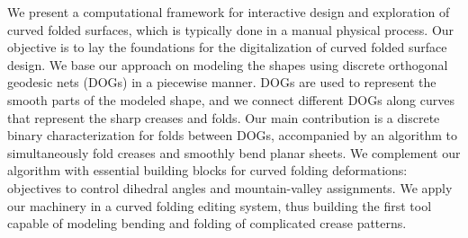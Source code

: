 We present a computational framework for interactive design and exploration of curved folded surfaces, which is typically done in a manual physical process. Our objective is to lay the foundations for the digitalization of curved folded surface design.
We base our approach on modeling the shapes using discrete orthogonal geodesic nets (DOGs) in a piecewise manner. DOGs are used to represent the smooth parts of the modeled shape, and we connect different DOGs along curves that represent the sharp creases and folds. 
Our main 
contribution is a discrete binary characterization for folds between DOGs, accompanied by an algorithm to simultaneously fold creases and smoothly bend planar sheets. We complement our algorithm with essential building blocks for curved folding deformations: objectives to control dihedral angles and mountain-valley assignments. We apply our machinery in a curved folding editing system, thus building the first tool capable of modeling bending and folding of complicated crease patterns.

